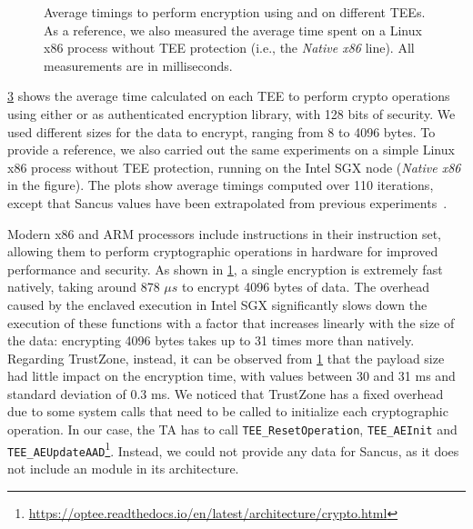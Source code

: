 \begin{figure}[t]
  \hspace*{-0.3cm}
  \begin{subfigure}{.48\linewidth}
    \centering
    \resizebox{\linewidth}{!} {
      
    }
    \caption{}
    \label{fig:eval-crypto-aes}
  \end{subfigure}
  \begin{subfigure}{.48\linewidth}
    \centering
    \resizebox{\linewidth}{!} {
      
    }
    \caption{}
    \label{fig:eval-crypto-spongent}
  \end{subfigure}
  \caption[Average encryption timings on different TEEs]{Average timings to perform encryption using  and
   on different \acp{TEE}. As a reference, we also measured the
  average time spent on a Linux x86 process without \ac{TEE} protection (i.e.,
  the \emph{Native x86} line). All measurements are in milliseconds.}
  \label{fig:eval-crypto}
\end{figure}

\cref{fig:eval-crypto} shows the average time calculated on each \ac{TEE} to
perform crypto operations using either \aesgcm{} or \spongent{} as authenticated
encryption library, with 128 bits of security. We used different sizes for the
data to encrypt, ranging from 8 to 4096 bytes. To provide a reference, we also
carried out the same experiments on a simple Linux x86 process without \ac{TEE}
protection, running on the Intel \ac{SGX} node (\emph{Native x86} in the
figure). The plots show average timings computed over 110 iterations, except
that Sancus values have been extrapolated from previous
experiments~\cite{noorman_sancus2}.

Modern x86 and ARM processors include \aes{} instructions in their instruction
set, allowing them to perform cryptographic operations in hardware for improved
performance and security. As shown in \cref{fig:eval-crypto-aes}, a single
\aes{} encryption is extremely fast natively, taking around 878 $\mu s$ to
encrypt 4096 bytes of data. The overhead caused by the enclaved execution in
Intel \ac{SGX} significantly slows down the execution of these functions with a
factor that increases linearly with the size of the data: encrypting 4096 bytes
takes up to 31 times more than natively. Regarding TrustZone, instead, it can be
observed from \cref{fig:eval-crypto-aes} that the payload size had little impact
on the encryption time, with values between 30 and 31 ms and standard deviation
of 0.3 ms. We noticed that TrustZone has a fixed overhead due to some system
calls that need to be called to initialize each cryptographic operation. In our
case, the TA has to call \texttt{TEE\_ResetOperation}, \texttt{TEE\_AEInit} and
\texttt{TEE\_AEUpdateAAD}\footnote{\url{https://optee.readthedocs.io/en/latest/architecture/crypto.html}}.
Instead, we could not provide any data for Sancus, as it does not include an
\aes{} module in its architecture.

